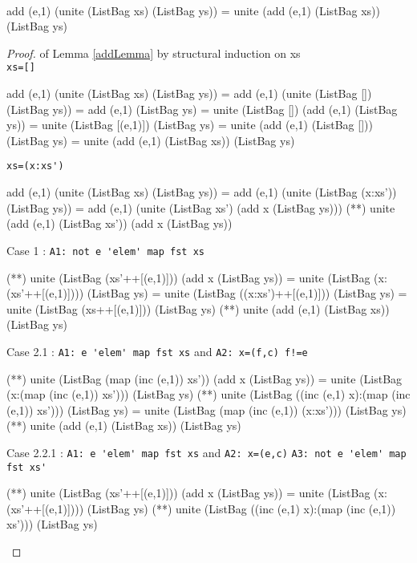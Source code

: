 \begin{lemma}\label{addLemma}\ 
\begin{code}
add (e,1) (unite (ListBag xs) (ListBag ys)) 
                 = unite (add (e,1) (ListBag xs)) (ListBag ys)
\end{code}
\end{lemma}
\begin{proof} of Lemma \ref{addLemma} by structural induction on xs\\
\verb|xs=[]| %
\begin{code}
add (e,1) (unite (ListBag xs) (ListBag ys)) 
             = add (e,1) (unite (ListBag []) (ListBag ys))
             = add (e,1) (ListBag ys)
             = unite (ListBag []) (add (e,1) (ListBag ys))
             = unite (ListBag [(e,1)]) (ListBag ys)
             = unite (add (e,1) (ListBag [])) (ListBag ys)
             = unite (add (e,1) (ListBag xs)) (ListBag ys)
\end{code}
\verb|xs=(x:xs')|
\begin{code}
add (e,1) (unite (ListBag xs) (ListBag ys))
             = add (e,1) (unite (ListBag (x:xs')) (ListBag ys))
             = add (e,1) (unite (ListBag xs') (add x (ListBag ys)))
             (*\sEq{IH}*) unite (add (e,1) (ListBag xs')) (add x (ListBag ys))
\end{code}
\hspace{1cm}Case 1 : \verb|A1: not e 'elem' map fst xs|
\begin{code}
             (**) unite (ListBag (xs'++[(e,1)])) (add x (ListBag ys))
             = unite (ListBag (x:(xs'++[(e,1)]))) (ListBag ys)
             = unite (ListBag ((x:xs')++[(e,1)])) (ListBag ys)
             = unite (ListBag (xs++[(e,1)])) (ListBag ys)
             (**) unite (add (e,1) (ListBag xs)) (ListBag ys)

\end{code}
\hspace{1cm}Case 2.1 : \verb|A1: e 'elem' map fst xs| and \verb|A2: x=(f,c) f!=e|
\begin{code}
             (**) unite (ListBag (map (inc (e,1)) xs')) (add x (ListBag ys))
             = unite (ListBag (x:(map (inc (e,1)) xs'))) (ListBag ys)
             (*\sEq{A2}*) unite (ListBag ((inc (e,1) x):(map (inc (e,1)) xs'))) (ListBag ys)
             = unite (ListBag (map (inc (e,1)) (x:xs'))) (ListBag ys)
             (*\sEq{A1}*) unite (add (e,1) (ListBag xs)) (ListBag ys)

\end{code}
\hspace{1cm}Case 2.2.1 : \verb|A1: e 'elem' map fst xs| and \verb|A2: x=(e,c)|
\hspace{1cm} \verb|A3: not e 'elem' map fst xs'|
\begin{code}
             (**) unite (ListBag (xs'++[(e,1)])) (add x (ListBag ys))
             = unite (ListBag (x:(xs'++[(e,1)]))) (ListBag ys)
             (**) unite (ListBag ((inc (e,1) x):(map (inc (e,1)) xs'))) (ListBag ys)
             

\end{code}
\end{proof}

